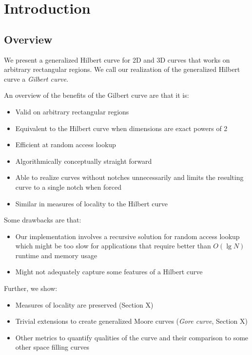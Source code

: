 \section{Introduction}

\subsection{Overview}

We present a generalized Hilbert curve for 2D and 3D curves
that works on arbitrary rectangular regions.
We call our realization of the generalized Hilbert curve a \textit{Gilbert curve}.

An overview of the benefits of the Gilbert curve are that it is:

\begin{itemize}
  \item Valid on arbitrary rectangular regions
  \item Equivalent to the Hilbert curve when dimensions are exact powers of 2
  \item Efficient at random access lookup
  \item Algorithmically conceptually straight forward
  \item Able to realize curves without notches unnecessarily and limits the resulting curve
        to a single notch when forced
  \item Similar in measures of locality to the Hilbert curve
\end{itemize}

Some drawbacks are that:

\begin{itemize}
  \item Our implementation involves a recursive solution for random access lookup
        which might be too slow for applications that require better than $O( \lg N)$
        runtime and memory usage
  \item Might not adequately capture some features of a Hilbert curve
\end{itemize}

Further, we show:

\begin{itemize}
  \item Measures of locality are preserved (Section X)
  \item Trivial extensions to create generalized Moore curves (\textit{Gore curve}, Section X)
  \item Other metrics to quantify qualities of the curve and their comparison to some other
        space filling curves
\end{itemize}


